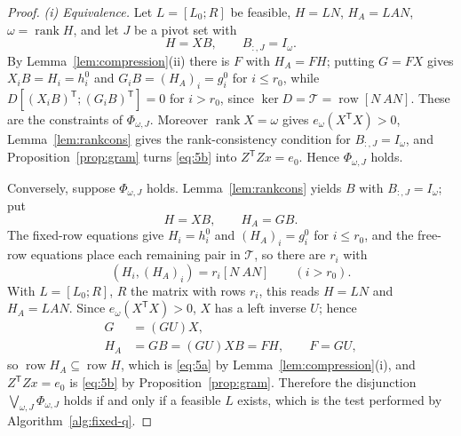 \documentclass[journal]{IEEEtran}
\theoremstyle{plainn}
\theoremstyle{remark}
\begin{document}
\begin{proof}
\emph{(i) Equivalence.} Let $L=[L_0;R]$ be feasible, $H=LN$, $H_A=LAN$,
$\omega=\operatorname{rank}H$, and let $J$ be a pivot set with
\begin{equation*}
H=XB,\qquad B_{:,J}=I_\omega .
\end{equation*}
By Lemma~\ref{lem:compression}(ii) there is $F$ with $H_A=FH$; putting $G=FX$ gives
$X_iB=H_i=h_i^0$ and $G_iB=(H_A)_i=g_i^0$ for $i\le r_0$, while
$D[(X_iB)^{\mathsf T};(G_iB)^{\mathsf T}]=0$ for $i>r_0$, since $\ker D=\mathcal T=\operatorname{row}[N\ AN]$.
These are the constraints of $\Phi_{\omega,J}$. Moreover $\operatorname{rank}X=\omega$ gives $e_\omega(X^{\mathsf T}X)>0$,
Lemma~\ref{lem:rankcons} gives the rank-consistency condition for
$B_{:,J}=I_\omega$, and Proposition~\ref{prop:gram} turns \eqref{eq:5b} into
$Z^{\mathsf T}Zx=e_0$. Hence $\Phi_{\omega,J}$ holds.

Conversely, suppose $\Phi_{\omega,J}$ holds. Lemma~\ref{lem:rankcons} yields
$B$ with $B_{:,J}=I_\omega$; put
\begin{equation*}
H=XB,\qquad H_A=GB .
\end{equation*}
The fixed-row equations give $H_i=h_i^0$ and $(H_A)_i=g_i^0$ for $i\le r_0$,
and the free-row equations place each remaining pair in $\mathcal T$, so there
are $r_i$ with
\begin{equation*}
(H_i,(H_A)_i)=r_i[N\ AN]\qquad(i>r_0).
\end{equation*}
With $L=[L_0;R]$, $R$ the matrix with rows $r_i$, this reads $H=LN$ and
$H_A=LAN$. Since $e_\omega(X^{\mathsf T}X)>0$, $X$ has a left inverse $U$;
hence
\begin{equation*}
\begin{aligned}
G&=(GU)X,\\
H_A&=GB=(GU)XB=FH,\qquad F=GU,
\end{aligned}
\end{equation*}
so $\operatorname{row}H_A\subseteq\operatorname{row}H$, which is
\eqref{eq:5a} by Lemma~\ref{lem:compression}(i), and $Z^{\mathsf T}Zx=e_0$ is
\eqref{eq:5b} by Proposition~\ref{prop:gram}. Therefore the disjunction
$\bigvee_{\omega,J}\Phi_{\omega,J}$ holds if and only if a feasible $L$
exists, which is the test performed by Algorithm~\ref{alg:fixed-q}.


\end{proof}
\end{document}
